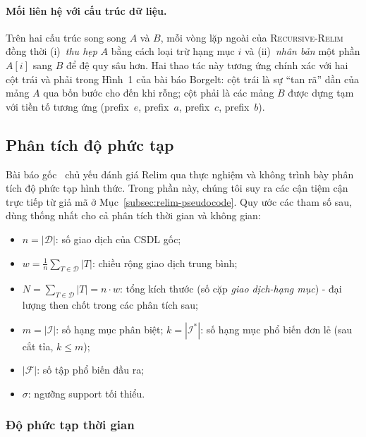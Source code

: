 \documentclass[12pt,a4paper]{report}
\begin{document}
\paragraph{Mối liên hệ với cấu trúc dữ liệu.}
Trên hai cấu trúc song song $A$ và $B$, mỗi vòng lặp ngoài của
\textsc{Recursive-Relim} đồng thời (i)~\textit{thu hẹp} $A$ bằng cách loại
trừ hạng mục $i$ và (ii)~\textit{nhân bản} một phần $A[i]$ sang $B$ để đệ quy
sâu hơn. Hai thao tác này tương ứng chính xác với hai cột trái và phải
trong Hình~1 của bài báo Borgelt: cột trái là sự ``tan rã'' dần của mảng $A$
qua bốn bước cho đến khi rỗng; cột phải là các mảng $B$ được dựng tạm với tiền
tố tương ứng (prefix~$e$, prefix~$a$, prefix~$c$, prefix~$b$).

\subsection{Phân tích độ phức tạp}
\label{subsec:relim-complexity}

Bài báo gốc~\cite{borgelt2005} chủ yếu đánh giá Relim qua thực nghiệm và không
trình bày phân tích độ phức tạp hình thức. Trong phần này, chúng tôi suy ra
các cận tiệm cận trực tiếp từ giả mã ở Mục~\ref{subsec:relim-pseudocode}. Quy
ước các tham số sau, dùng thống nhất cho cả phân tích thời gian và không gian:
\begin{itemize}
    \item $n = |\mathcal{D}|$: số giao dịch của CSDL gốc;
    \item $w = \frac{1}{n}\sum_{T \in \mathcal{D}}|T|$: chiều rộng giao dịch
    trung bình;
    \item $N = \sum_{T \in \mathcal{D}}|T| = n \cdot w$: tổng kích thước (số
    cặp \textit{giao dịch-hạng mục}) - đại lượng then chốt trong các phân
    tích sau;
    \item $m = |\mathcal{I}|$: số hạng mục phân biệt; $k = |\mathcal{I}^*|$: số
    hạng mục phổ biến đơn lẻ (sau cắt tỉa, $k \leq m$);
    \item $|\mathcal{F}|$: số tập phổ biến đầu ra;
    \item $\sigma$: ngưỡng support tối thiểu.
\end{itemize}


\subsubsection*{Độ phức tạp thời gian}
\end{document}
